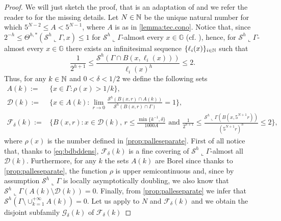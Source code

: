 \documentclass[10pt, a4paper,
oneside, headinclude,footinclude]{scrartcl}
\begin{document}
\begin{proof}
We will just sketch the proof, that is an adaptation of \cite[Proposition 4.6]{antonelli2020rectifiable} and we refer the reader to \cite[Proposition 4.6]{antonelli2020rectifiable} for the missing details. Let $N\in \mathbb{N}$ be the unique natural number for which $5^{N-2}\leq A<5^{N-1}$, where $A$ is as in \cref{lemma:tec.cono}. Notice that, since $2^{-h}\leq \Theta^{h,*}(\mathcal{S}^h\llcorner\Gamma,x)\leq 1$ for $\mathcal{S}^h\llcorner\Gamma$-almost every $x\in\mathbb G$ (cf. \cite[2.10.19(1) and 2.10.19(5)]{Federer1996GeometricTheory}), hence, for $\mathcal{S}^h\llcorner \Gamma$-almost every $x\in\mathbb G$ there exists an infinitesimal sequence $\{\ell_i(x)\}_{i\in\mathbb{N}}$ such that
\begin{equation}
    \frac{1}{2^{h+1}}\leq\frac{\mathcal{S}^h(\Gamma\cap B(x,\ell_i(x)))}{\ell_i(x)^h}\leq 2.
    \label{eq:bdbddens}
\end{equation}
Thus, for any $k\in\mathbb{N}$ and $0<\delta<1/2$ we define the following sets
\begin{equation}
    \begin{split}
        A(k):=&\{x\in \Gamma:\rho (x)>1/k\},\\
        \mathscr{D}(k):=&\bigg\{x\in A(k):\lim_{r\to 0}\frac{\mathcal{S}^{h}(B(x,r)\cap A(k))}{\mathcal{S}^{h}(B(x,r)\cap \Gamma)}=1\bigg\},\\
        \mathscr{F}_{\delta}(k):=&\bigg\{B(x,r):x\in \mathscr{D}(k) \text{, }r\leq \frac{\min\{k^{-1},\delta\}}{1000 A}\text{ and }\frac{1}{2^{h+1}}\leq\frac{\mathcal{S}^h\llcorner\Gamma(B(x,5^{N+1}r))}{(5^{N+1}r)^h}\leq 2\bigg\},
    \end{split}
\end{equation}
where $\rho(x)$ is the number defined in \cref{prop:palleseparate}.
First of all notice that, thanks to \eqref{eq:bdbddens}, $\mathscr{F}_{\delta}(k)$ is a fine covering of $\mathcal{S}^h\llcorner\Gamma$-almost all $\mathscr{D}(k)$. Furthermore, for any $k$ the sets $A(k)$ are Borel since thanks to \cref{prop:palleseparate}, the function $\rho$ is upper semicontinuous and, since by assumption $\mathcal{S}^h\llcorner \Gamma$ is locally asymptotically doubling, we also know that $\mathcal{S}^h\llcorner \Gamma(A(k)\setminus\mathscr{D}(k))=0 $. Finally, from \cref{prop:palleseparate} we infer that $\mathcal{S}^h(\Gamma\setminus\cup_{k=1}^{+\infty} A(k))=0$. 
Let us apply \cite[Lemma 4.5]{antonelli2020rectifiable} to $N$ and $\mathscr{F}_\delta(k)$ and we obtain the disjoint subfamily $\mathscr{G}_\delta(k)$ of $\mathscr{F}_\delta(k)$

\end{proof}
\end{document}
